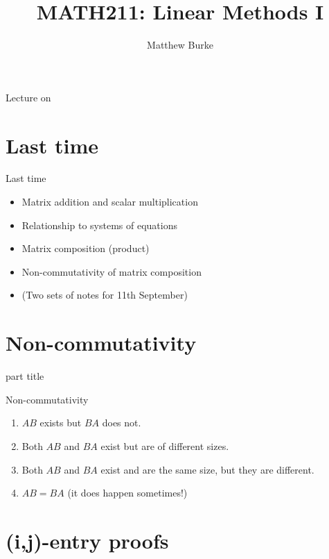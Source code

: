 \documentclass{beamer}
\title{MATH211: Linear Methods I}
\author{Matthew Burke}
\date{\lectureDate}
\newcommand{\lectureDate}{\formatdate{18}{09}{2018}}
\begin{document}
\frame{\titlepage}

\begin{frame}{Lecture on \lectureDate}
  \tableofcontents
\end{frame}

\section*{Last time}
\label{sec:Last-time}
\begin{frame}{Last time}
  \begin{itemize}
  \item Matrix addition and scalar multiplication\vfill
  \item Relationship to systems of equations\vfill
  \item Matrix composition (product)\vfill
  \item Non-commutativity of matrix composition\vfill
  \item (Two sets of notes for 11th September)
  \end{itemize}
\end{frame}

\section{Non-commutativity}

\begin{frame}
  \begin{beamercolorbox}[sep=12pt,center]{part title}
    \insertsection\par
  \end{beamercolorbox}
\end{frame}

\begin{frame}{Non-commutativity}
  \begin{enumerate}
  \item $AB$ exists but $BA$ does not.\vfill
  \item Both $AB$ and $BA$ exist but are of different sizes.\vfill
  \item Both $AB$ and $BA$ exist and are the same size, but they are different.\vfill
  \item $AB = BA$ (it does happen sometimes!)
  \end{enumerate}
\end{frame}

\section{(i,j)-entry proofs}
\end{document}
